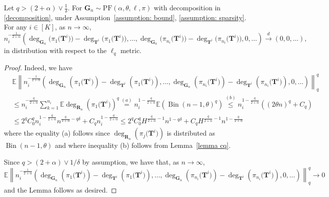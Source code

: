 \documentclass[twoside,11pt]{article}
\theoremstyle{remark}
\begin{document}
\begin{lemma}
\label{lemma R}
Let $q > \left(2+\alpha\right) \vee \frac{1}{\delta}$. For $\boldsymbol{G}_n \sim \mathrm{PF}(\alpha, \theta, \ell, \pi)$ with decomposition in \eqref{decomposition}, under Assumption~\ref{assumption: bound}, \ref{assumption: sparsity}. For any $i \in \left[K\right]$, as $n \rightarrow \infty$,
%
\begingroup
$$
n_i^{-\frac{1}{2+\alpha}}\left(\operatorname{deg}_{\boldsymbol{G}_n}\bigl(\pi_1\bigl(\boldsymbol{T}^i\bigr)\bigr)-\operatorname{deg}_{\boldsymbol{T}^i}\bigl(\pi_1\bigl(\boldsymbol{T}^i\bigr)\bigr), \ldots, \operatorname{deg}_{\boldsymbol{G}_n}\bigl(\pi_{n_i}\bigl(\boldsymbol{T}^i\bigr)\bigr)-\operatorname{deg}_{\boldsymbol{T}^i}\bigl(\pi_{n_i}\bigl(\boldsymbol{T}^i\bigr)\bigr), 0, \ldots\right) \xrightarrow{d}\left(0, 0, \ldots\right),
$$
\endgroup
%
in distribution with respect to the $\ell_q$ metric.
\end{lemma}

\begin{proof}
Indeed, we have
\begingroup
$$
\begin{aligned}
&\mathbb{E} \left\|n_i^{-\frac{1}{2+\alpha}}\left(\operatorname{deg}_{\boldsymbol{G}_n}\left(\pi_1\bigl(\boldsymbol{T}^i\bigr)\right)-\operatorname{deg}_{\boldsymbol{T}^i}\left(\pi_1\bigl(\boldsymbol{T}^i\bigr)\right), \ldots, \operatorname{deg}_{\boldsymbol{G}_n}\left(\pi_{n_i}\bigl(\boldsymbol{T}^i\bigr)\right)-\operatorname{deg}_{\boldsymbol{T}^i}\left(\pi_{n_i}\bigl(\boldsymbol{T}^i\bigr)\right), 0, \ldots\right) \right\|_q^q\\
&\le n_i^{-\frac{q}{2+\alpha}} \sum_{k=1}^{n_i} \mathbb{E}\operatorname{deg}_{\boldsymbol{R}_n}\left(\pi_1\bigl(\boldsymbol{T}^i\bigr)\right)^q\stackrel{(a)}{=} n_i^{1-\frac{q}{2+\alpha}} \mathbb{E}\left(\operatorname{Bin}(n-1, \theta)^q\right) \stackrel{(b)}{\leq} n_i^{1-\frac{q}{2+\alpha}}\left((2 \theta n)^q+C_q\right) \\
& \leq 2^q C^q_0 n_i^{1-\frac{q}{2+\alpha}} n^{\frac{q}{2+\alpha}-q \delta}+C_q n_i^{1-\frac{q}{2+\alpha}}\le 2^q C^q_0 H^{\frac{q}{2+\alpha}-1}n^{1-q \delta}+C_q H^{\frac{q}{2+\alpha}-1} n^{1-\frac{q}{2+\alpha}}
\end{aligned}
$$
\endgroup
where the equality (a) follows since $\operatorname{deg}_{\boldsymbol{R}_n}\left(\pi_j\bigl(\boldsymbol{T}^i\bigr)\right)$ is distributed as $\operatorname{Bin}(n-1, \theta)$ and where inequality (b) follows from Lemma~\ref{lemma cq}.

Since $q>\left(2+\alpha\right) \vee 1 / \delta$ by assumption, we have that, as $n \rightarrow \infty$,
\begingroup
$$
\mathbb{E}\left\|n_i^{-\frac{1}{2+\alpha}}\left(\operatorname{deg}_{\boldsymbol{G}_n}\left(\pi_1\bigl(\boldsymbol{T}^i\bigr)\right)-\operatorname{deg}_{\boldsymbol{T}^i}\left(\pi_1\bigl(\boldsymbol{T}^i\bigr)\right), \ldots, \operatorname{deg}_{\boldsymbol{G}_n}\left(\pi_{n_i}\bigl(\boldsymbol{T}^i\bigr)\right)-\operatorname{deg}_{\boldsymbol{T}^i}\left(\pi_{n_i}\bigl(\boldsymbol{T}^i\bigr)\right), 0, \ldots\right) \right\|^q_q \rightarrow 0
$$
\endgroup
and the Lemma follows as desired.
\end{proof}
\end{document}

